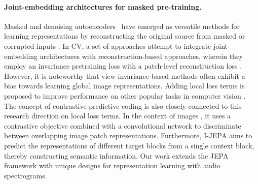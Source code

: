 \documentclass{article}
\begin{document}
\paragraph{Joint-embedding architectures for masked pre-training.}
Masked and denoising autoencoders~\cite{dae,sae,bert} have emerged as versatile methods for learning representations by reconstructing the original source from masked or corrupted inputs \cite{feiincorporating,fei2023uncertainty}.
In CV, a set of approaches attempt to integrate joint-embedding architectures with reconstruction-based approaches, wherein they employ an invariance pretraining loss with a patch-level reconstruction loss \cite{zhou2021ibot,PathakKDDE16,chen2020,mae,maskedfeat}. 
However, it is noteworthy that view-invariance-based methods often exhibit a bias towards learning global image representations. Adding local loss terms is proposed to improve performance on other popular tasks in computer vision \cite{bardes2022vicregl,chen2022intra,gidaris2020learning}. 
The concept of contrastive predictive coding \cite{oord2018representation} is also closely connected to this research direction on local loss terms. In the context of images \cite{henaff2020data}, it uses a contrastive objective combined with a convolutional network to discriminate between overlapping image patch representations. 
Furthermore,  I-JEPA \cite{assran2023self} aims to predict the representations of different target blocks from a single context block, thereby constructing semantic information.  
Our work extends the JEPA framework with unique designs for representation learning with audio spectrograms. 
\end{document}
